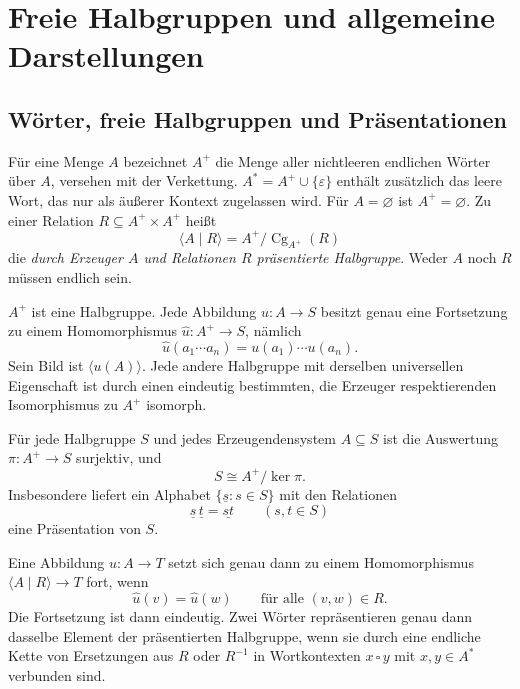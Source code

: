 \chapter{Freie Halbgruppen und allgemeine Darstellungen}

\section{Wörter, freie Halbgruppen und Präsentationen}

\begin{definition}
Für eine Menge $A$ bezeichnet $A^+$ die Menge aller nichtleeren
endlichen Wörter über $A$, versehen mit der Verkettung.
$A^*=A^+\cup\{\varepsilon\}$ enthält zusätzlich das leere Wort,
das nur als äußerer Kontext zugelassen wird.
Für $A=\varnothing$ ist $A^+=\varnothing$.
Zu einer Relation $R\subseteq A^+\times A^+$ heißt
\[
 \langle A\mid R\rangle=A^+/\operatorname{Cg}_{A^+}(R)
\]
die \emph{durch Erzeuger $A$ und Relationen $R$ präsentierte Halbgruppe}.
Weder $A$ noch $R$ müssen endlich sein.
\end{definition}

\begin{theorem}
\label{b28guide:thm:free}
$A^+$ ist eine Halbgruppe.
Jede Abbildung $u:A\to S$ besitzt genau eine Fortsetzung
zu einem Homomorphismus $\widehat u:A^+\to S$, nämlich
\[
 \widehat u(a_1\cdots a_n)=u(a_1)\cdots u(a_n).
\]
Sein Bild ist $\langle u(A)\rangle$.
Jede andere Halbgruppe mit derselben universellen Eigenschaft
ist durch einen eindeutig bestimmten, die Erzeuger respektierenden
Isomorphismus zu $A^+$ isomorph.
\cite{harju,gould}
\end{theorem}

\begin{theorem}
\label{b28guide:thm:presentation}
Für jede Halbgruppe $S$ und jedes Erzeugendensystem $A\subseteq S$
ist die Auswertung $\pi:A^+\to S$ surjektiv, und
\[
 S\cong A^+/\ker\pi .
\]
Insbesondere liefert ein Alphabet
$\{\underline{s}:s\in S\}$ mit den Relationen
\[
 \underline{s}\,\underline{t}=\underline{st}
 \qquad(s,t\in S)
\]
eine Präsentation von $S$.
\cite{harju}
\end{theorem}

\begin{theorem}
Eine Abbildung $u:A\to T$ setzt sich genau dann zu einem
Homomorphismus $\langle A\mid R\rangle\to T$ fort, wenn
\[
 \widehat u(v)=\widehat u(w)\qquad\text{für alle }(v,w)\in R.
\]
Die Fortsetzung ist dann eindeutig.
Zwei Wörter repräsentieren genau dann dasselbe Element der
präsentierten Halbgruppe, wenn sie durch eine endliche Kette
von Ersetzungen aus $R$ oder $R^{-1}$ in Wortkontexten
$x\,\square\,y$ mit $x,y\in A^*$ verbunden sind.
\cite{harju}
\end{theorem}


